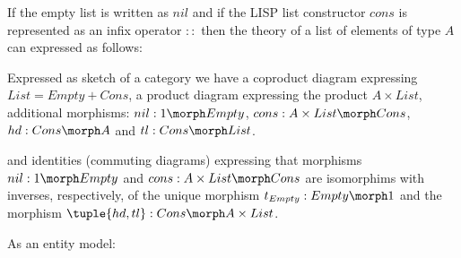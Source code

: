 \begin{minipage}{\textwidth}
\begin{notebox}

If the empty list is written as $nil$ and if the LISP list constructor $cons$ is represented
as an infix operator $::$ then the theory of a list of elements of type $A$ can expressed as follows: 
\begin{gatrules}
\gatintros
{}   
\gataxioms
{}                            
\end{gatrules}
Expressed as sketch of a category we have a coproduct diagram
expressing $List = Empty + Cons$,
a product diagram expressing the product $A \times List$,
additional morphisms:
$nil: 1 \morph Empty$,
$cons : A \times List \morph Cons$,
$hd: Cons \morph A$ and
$tl: Cons \morph List$.

and identities (commuting diagrams) expressing that
morphisms $nil: 1 \morph Empty$ and $cons : A \times List \morph Cons$ are isomorphims 
with inverses, respectively, of the unique morphism $t_{Empty}: Empty \morph 1$
and the morphism $\tuple{hd,tl}:Cons \morph A \times List$. 

As an entity model:
\begin{center}
 
\end{center}
\end{notebox}
\end{minipage}